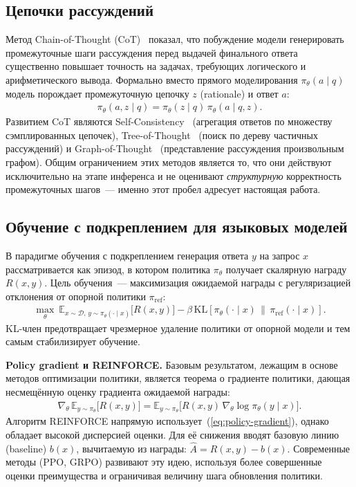 \subsection{Цепочки рассуждений}
\label{subsec:theory-cot}

Метод Chain-of-Thought (CoT)~\cite{wei2022chain} показал, что побуждение модели генерировать промежуточные шаги рассуждения перед выдачей финального ответа существенно повышает точность на задачах, требующих логического и арифметического вывода. Формально вместо прямого моделирования $\pi_\theta(a \mid q)$ модель порождает промежуточную цепочку $z$ (rationale) и ответ $a$:
\begin{align}
    \pi_\theta(a, z \mid q) = \pi_\theta(z \mid q)\, \pi_\theta(a \mid q, z).
\end{align}
Развитием CoT являются Self-Consistency~\cite{wang2023selfconsistency} (агрегация ответов по множеству сэмплированных цепочек), Tree-of-Thought~\cite{yao2023tree} (поиск по дереву частичных рассуждений) и Graph-of-Thought~\cite{besta2024graph} (представление рассуждения произвольным графом). Общим ограничением этих методов является то, что они действуют исключительно на этапе инференса и не оценивают \textit{структурную} корректность промежуточных шагов~--- именно этот пробел адресует настоящая работа.

\subsection{Обучение с подкреплением для языковых моделей}
\label{subsec:theory-rl}

В парадигме обучения с подкреплением генерация ответа $y$ на запрос $x$ рассматривается как эпизод, в котором политика $\pi_\theta$ получает скалярную награду $R(x, y)$. Цель обучения~--- максимизация ожидаемой награды с регуляризацией отклонения от опорной политики $\pi_{\mathrm{ref}}$:
\begin{align}
    \max_{\theta}\ \mathbb{E}_{x \sim \mathcal{D},\, y \sim \pi_\theta(\cdot \mid x)} \big[ R(x, y) \big] - \beta\, \mathrm{KL}\!\left[\pi_\theta(\cdot \mid x)\,\|\,\pi_{\mathrm{ref}}(\cdot \mid x)\right].
    \label{eq:rl-objective}
\end{align}
KL-член предотвращает чрезмерное удаление политики от опорной модели и тем самым стабилизирует обучение.

\textbf{Policy gradient и REINFORCE.} Базовым результатом, лежащим в основе методов оптимизации политики, является теорема о градиенте политики, дающая несмещённую оценку градиента ожидаемой награды:
\begin{align}
    \nabla_\theta\, \mathbb{E}_{y \sim \pi_\theta}\big[R(x, y)\big] = \mathbb{E}_{y \sim \pi_\theta}\big[R(x, y)\, \nabla_\theta \log \pi_\theta(y \mid x)\big].
    \label{eq:policy-gradient}
\end{align}
Алгоритм REINFORCE напрямую использует~(\ref{eq:policy-gradient}), однако обладает высокой дисперсией оценки. Для её снижения вводят базовую линию (baseline) $b(x)$, вычитаемую из награды: $\hat{A} = R(x, y) - b(x)$. Современные методы (PPO, GRPO) развивают эту идею, используя более совершенные оценки преимущества и ограничивая величину шага обновления политики.

